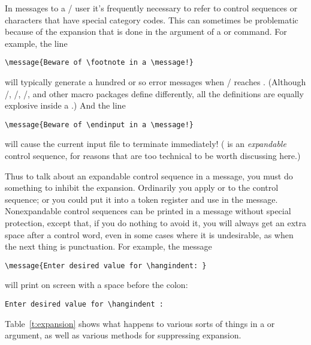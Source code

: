 {In messages to a \tex/ user it's frequently necessary to refer
to control sequences or characters that have special category codes.
This can sometimes be problematic because of the expansion that is
done in the argument of a  or  command. For
example, the line
 \begin{verbatim}
\message{Beware of \footnote in a \message!}
\end{verbatim}
will typically generate a hundred or so error messages when
\tex/ reaches . (Although \plaintex/, \amstex/, \latex/,
and other macro packages define  differently,
all the definitions are equally explosive inside a .)
And the line
\begin{verbatim}
\message{Beware of \endinput in a \message!}
\end{verbatim}
 will cause the current input file to terminate immediately!
( is an {\em expandable} control sequence, for
reasons that are too technical
to be worth discussing here.)

Thus to talk about an expandable control sequence in a message, you
must do something to inhibit the expansion.  Ordinarily
you apply  or  to the control sequence;
or you could put it into a token register and use
 in the message.
Nonexpandable
control sequences can be printed in a message without special
protection, except that, if you do nothing to avoid it, you will
always get an extra space after a control word, even in
some cases where it is undesirable, as when the next
thing is punctuation. For example, the message
\begin{verbatim}
\message{Enter desired value for \hangindent: }
\end{verbatim}
will print on screen with a space before the colon:
\begin{verbatim}
Enter desired value for \hangindent :
\end{verbatim}

Table~\ref{t:expansion} shows what happens to various sorts of things
in a  or  argument, as well as various methods
for suppressing expansion.

}
